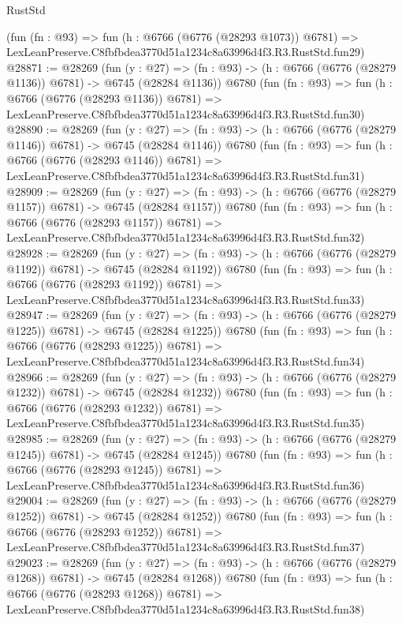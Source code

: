 \begin{lexlean}{RustStd}
\begin{coremodule}
    (fun (fn : @93) =>
    fun (h : @6766 (@6776 (@28293 @1073)) @6781) =>
    LexLeanPreserve.C8fbfbdea3770d51a1234c8a63996d4f3.R3.RustStd.fun29)
@28871 := @28269
    (fun (y : @27) =>
    (fn : @93) -> (h : @6766 (@6776 (@28279 @1136)) @6781) -> @6745 (@28284 @1136))
    @6780
    (fun (fn : @93) =>
    fun (h : @6766 (@6776 (@28293 @1136)) @6781) =>
    LexLeanPreserve.C8fbfbdea3770d51a1234c8a63996d4f3.R3.RustStd.fun30)
@28890 := @28269
    (fun (y : @27) =>
    (fn : @93) -> (h : @6766 (@6776 (@28279 @1146)) @6781) -> @6745 (@28284 @1146))
    @6780
    (fun (fn : @93) =>
    fun (h : @6766 (@6776 (@28293 @1146)) @6781) =>
    LexLeanPreserve.C8fbfbdea3770d51a1234c8a63996d4f3.R3.RustStd.fun31)
@28909 := @28269
    (fun (y : @27) =>
    (fn : @93) -> (h : @6766 (@6776 (@28279 @1157)) @6781) -> @6745 (@28284 @1157))
    @6780
    (fun (fn : @93) =>
    fun (h : @6766 (@6776 (@28293 @1157)) @6781) =>
    LexLeanPreserve.C8fbfbdea3770d51a1234c8a63996d4f3.R3.RustStd.fun32)
@28928 := @28269
    (fun (y : @27) =>
    (fn : @93) -> (h : @6766 (@6776 (@28279 @1192)) @6781) -> @6745 (@28284 @1192))
    @6780
    (fun (fn : @93) =>
    fun (h : @6766 (@6776 (@28293 @1192)) @6781) =>
    LexLeanPreserve.C8fbfbdea3770d51a1234c8a63996d4f3.R3.RustStd.fun33)
@28947 := @28269
    (fun (y : @27) =>
    (fn : @93) -> (h : @6766 (@6776 (@28279 @1225)) @6781) -> @6745 (@28284 @1225))
    @6780
    (fun (fn : @93) =>
    fun (h : @6766 (@6776 (@28293 @1225)) @6781) =>
    LexLeanPreserve.C8fbfbdea3770d51a1234c8a63996d4f3.R3.RustStd.fun34)
@28966 := @28269
    (fun (y : @27) =>
    (fn : @93) -> (h : @6766 (@6776 (@28279 @1232)) @6781) -> @6745 (@28284 @1232))
    @6780
    (fun (fn : @93) =>
    fun (h : @6766 (@6776 (@28293 @1232)) @6781) =>
    LexLeanPreserve.C8fbfbdea3770d51a1234c8a63996d4f3.R3.RustStd.fun35)
@28985 := @28269
    (fun (y : @27) =>
    (fn : @93) -> (h : @6766 (@6776 (@28279 @1245)) @6781) -> @6745 (@28284 @1245))
    @6780
    (fun (fn : @93) =>
    fun (h : @6766 (@6776 (@28293 @1245)) @6781) =>
    LexLeanPreserve.C8fbfbdea3770d51a1234c8a63996d4f3.R3.RustStd.fun36)
@29004 := @28269
    (fun (y : @27) =>
    (fn : @93) -> (h : @6766 (@6776 (@28279 @1252)) @6781) -> @6745 (@28284 @1252))
    @6780
    (fun (fn : @93) =>
    fun (h : @6766 (@6776 (@28293 @1252)) @6781) =>
    LexLeanPreserve.C8fbfbdea3770d51a1234c8a63996d4f3.R3.RustStd.fun37)
@29023 := @28269
    (fun (y : @27) =>
    (fn : @93) -> (h : @6766 (@6776 (@28279 @1268)) @6781) -> @6745 (@28284 @1268))
    @6780
    (fun (fn : @93) =>
    fun (h : @6766 (@6776 (@28293 @1268)) @6781) =>
    LexLeanPreserve.C8fbfbdea3770d51a1234c8a63996d4f3.R3.RustStd.fun38)

\end{coremodule}
\end{lexlean}
